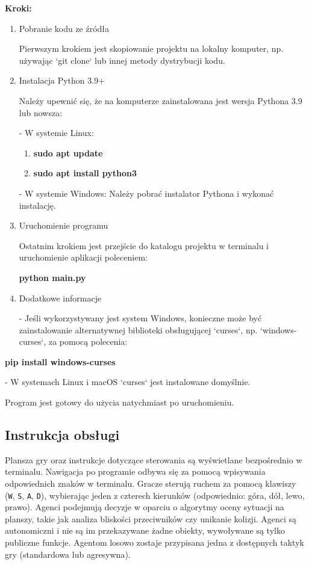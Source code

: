 \documentclass[12pt,a4paper]{article}
\begin{document}
\textbf{Kroki:}
\begin{enumerate}
    \item Pobranie kodu ze źródła
    
Pierwszym krokiem jest skopiowanie projektu na lokalny komputer, np. używając `git clone` lub innej metody dystrybucji kodu.

    \item Instalacja Python 3.9+
    
Należy upewnić się, że na komputerze zainstalowana jest wersja Pythona 3.9 lub nowsza:

- W systemie Linux:

\begin{enumerate}
    \item\textbf{sudo apt update} \\
    \item \textbf{sudo apt install python3}
\end{enumerate}

- W systemie Windows:
Należy pobrać instalator Pythona i wykonać instalację.

    \item  Uruchomienie programu
    
Ostatnim krokiem jest przejście do katalogu projektu w terminalu i uruchomienie aplikacji poleceniem:

\begin{enumerate}
    \textbf{python main.py}
\end{enumerate}

    \item Dodatkowe informacje
    
- Jeśli wykorzystywany jest system Windows, konieczne może być zainstalowanie alternatywnej biblioteki obsługującej `curses`, np. `windows-curses`, za pomocą polecenia:
\end{enumerate}

\begin{enumerate}
     \textbf{pip install windows-curses}
\end{enumerate}

   - W systemach Linux i macOS `curses` jest instalowane domyślnie.
 
 \break
Program jest gotowy do użycia natychmiast po uruchomieniu. 

	\subsection{Instrukcja obsługi}
Plansza gry oraz instrukcje dotyczące sterowania są wyświetlane bezpośrednio w terminalu. Nawigacja po programie odbywa się za pomocą wpisywania odpowiednich znaków w terminalu. Gracze sterują ruchem za pomocą klawiszy (\verb|W|, \verb|S|, \verb|A|, \verb|D|), wybierając jeden z czterech kierunków (odpowiednio: góra, dół, lewo, prawo). Agenci podejmują decyzje w oparciu o algorytmy oceny sytuacji na planszy, takie jak analiza bliskości przeciwników czy unikanie kolizji. Agenci są autonomiczni i nie są im przekazywane żadne obiekty, wywoływane są tylko publiczne funkcje. Agentom losowo zostaje przypisana jedna z dostępnych taktyk gry (standardowa lub agresywna).
\end{document}
